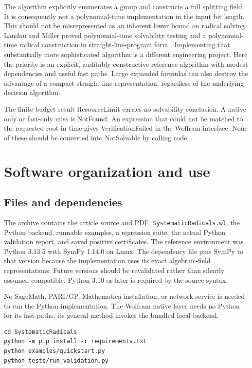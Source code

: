 \documentclass[11pt,a4paper]{article}
\theoremstyle{definition}
\theoremstyle{remark}
\newcommand{\code}[1]{\texttt{#1}}
\newcommand{\status}[1]{\textsf{#1}}
\begin{document}
The algorithm explicitly enumerates a group and constructs a full splitting
field. It is consequently not a polynomial-time implementation in the input
bit length. This should not be misrepresented as an inherent lower bound on
radical solving. Landau and Miller proved polynomial-time solvability testing
and a polynomial-time radical construction in straight-line-program form
\cite{landau-miller}. Implementing that substantially more sophisticated
algorithm is a different engineering project. Here the priority is an explicit,
auditably constructive reference algorithm with modest dependencies and useful
fast paths. Large expanded formulas can also destroy the advantage of a compact
straight-line representation, regardless of the underlying decision algorithm.

The finite-budget result \status{ResourceLimit} carries no solvability
conclusion. A native-only or fast-only miss is \status{NotFound}. An expression
that could not be matched to the requested root in time gives
\status{VerificationFailed} in the Wolfram interface. None of these should be
converted into \status{NotSolvable} by calling code.

\section{Software organization and use}
\label{sec:software}
\subsection{Files and dependencies}
The archive contains the article source and PDF, \code{SystematicRadicals.wl},
the Python backend, runnable examples, a regression suite, the actual Python
validation report, and saved positive certificates. The reference environment
was Python 3.13.5 with SymPy 1.14.0 on Linux. The dependency file pins SymPy to
that version because the implementation uses its exact algebraic-field
representations. Future versions should be revalidated rather than silently
assumed compatible. Python 3.10 or later is required by the source syntax.

No SageMath, PARI/GP, Mathematica installation, or network service is needed to
run the Python implementation. The Wolfram native layer needs no Python for
its fast paths; its general method invokes the bundled local backend.

\begin{lstlisting}
cd SystematicRadicals
python -m pip install -r requirements.txt
python examples/quickstart.py
python tests/run_validation.py
\end{lstlisting}
\end{document}
